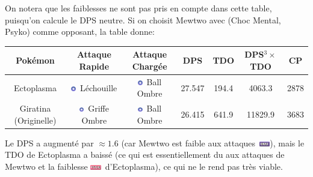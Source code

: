 \documentclass[12pt]{beamer}
\newcommand{\ghostfull}{\includegraphics[height=0.2cm]{../../../images/type/full/Ghost.png}}
\newcommand{\psychicfull}{\includegraphics[height=0.2cm]{../../../images/type/full/Psychic.png}}
\newcommand{\ghostsimp}{\includegraphics[height=0.2cm]{../../../images/type/simplified/ghost.png}}
\begin{document}
\begin{frame}
\begin{block}{}
\begin{footnotesize}
On notera que les faiblesses ne sont pas pris en compte dans cette table, puisqu'on calcule le DPS neutre. Si on choisit Mewtwo avec (Choc Mental, Psyko) comme opposant, la table donne:   
\begin{center}
\begin{tabular}{ccccccc}
Pokémon & Attaque Rapide & Attaque Chargée& DPS & TDO & DPS$^3 \times$ TDO & CP \\ \hline
Ectoplasma&	\ghostsimp~Léchouille	&\ghostsimp~Ball Ombre &27.547& 194.4 & 4063.3& 2878\\ 
Giratina (Originelle)&	\ghostsimp~Griffe Ombre	&\ghostsimp~Ball Ombre &	26.415	&641.9	&11829.9	&3683\\ 
\end{tabular}
\end{center}

Le DPS a augmenté par $\approx 1.6$ (car Mewtwo est faible aux attaques~\ghostfull), mais le TDO de Ectoplasma a baissé (ce qui est essentiellement du aux attaques de Mewtwo et la faiblesse \psychicfull~d'Ectoplasma), ce qui ne le rend pas très viable.
\end{footnotesize}
\end{block}
\end{frame}
\end{document}
